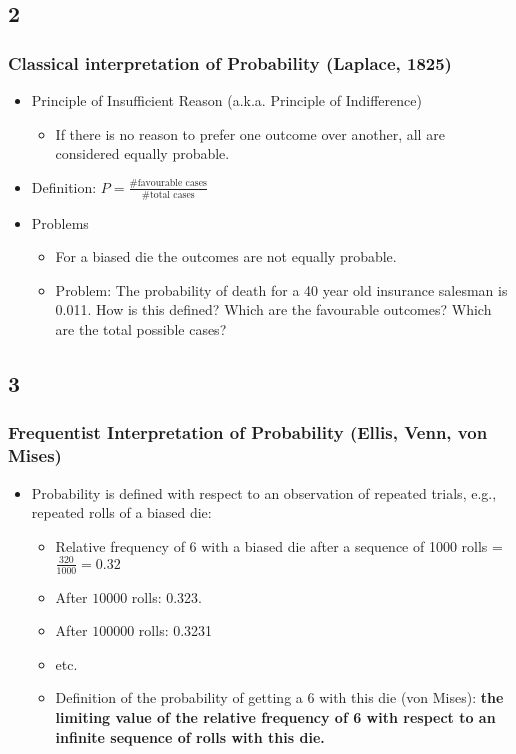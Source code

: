 \documentclass{beamer}
\begin{document}
\subsection*{2}
\begin{frame}
\frametitle{Classical interpretation of Probability (Laplace, 1825)}
\begin{itemize}
\item Principle of Insufficient Reason (a.k.a. Principle of Indifference)
  \begin{itemize}
  \item If there is no reason to prefer one outcome over another, all are
    considered equally probable.
  \end{itemize}
\item Definition: $P = \frac{\mbox{\# favourable cases}}{\mbox{\# total
    cases}}$
\item Problems
  \begin{itemize}
  \item For a biased die the outcomes are not equally probable.
  \item Problem: The probability of death for a 40 year old insurance salesman
    is 0.011. How is this defined? Which are the favourable outcomes? Which are
    the total possible cases?
  \end{itemize}
\end{itemize}
\end{frame}

\subsection*{3}
\begin{frame}
\frametitle{Frequentist Interpretation of Probability (Ellis, Venn, von Mises)}
\begin{itemize}
\item Probability is defined with respect to an observation of repeated trials,
  e.g., repeated rolls of a biased die:
  \begin{itemize}
  \item Relative frequency of 6 with a biased die after a sequence of 1000
    rolls = $\frac{320}{1000} = 0.32$
  \item After $10000$ rolls: 0.323.
  \item After $100000$ rolls: 0.3231
  \item etc.
  \item Definition of the probability of getting a 6 with this die (von Mises):
    \textbf{the limiting value of the relative frequency of 6 with respect to
      an infinite sequence of rolls with this die.}
  \end{itemize}
\end{itemize}
\end{frame}
\end{document}
